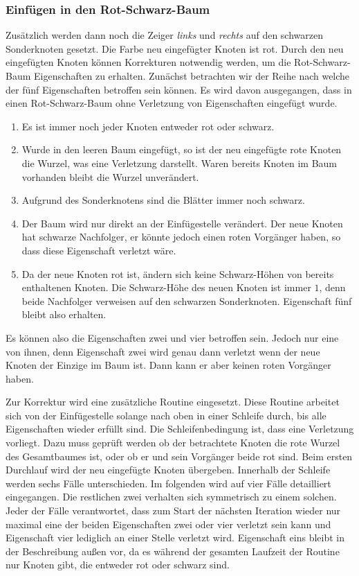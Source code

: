 \documentclass[a4paper,12pt]{article}
\begin{document}
\subsubsection{Einfügen in den Rot-Schwarz-Baum}


Zusätzlich werden dann noch die Zeiger \textit{links} und  \textit{rechts} auf den schwarzen Sonderknoten gesetzt. Die Farbe neu eingefügter Knoten ist rot. Durch den neu eingefügten Knoten können Korrekturen notwendig werden, um die Rot-Schwarz-Baum Eigenschaften zu erhalten. Zunächst betrachten wir der Reihe nach welche der fünf Eigenschaften betroffen sein können. Es wird davon ausgegangen, dass in einen Rot-Schwarz-Baum ohne Verletzung von Eigenschaften eingefügt wurde. \\

\begin{enumerate}
	\item Es ist immer noch jeder Knoten entweder rot oder schwarz.
	\item Wurde in den leeren Baum eingefügt, so ist der neu eingefügte rote Knoten die Wurzel, was eine Verletzung darstellt. Waren bereits Knoten im Baum vorhanden bleibt die Wurzel unverändert.
	\item Aufgrund des Sonderknotens sind die Blätter immer noch schwarz.
	\item Der Baum wird nur direkt an der Einfügestelle verändert. Der neue Knoten hat schwarze Nachfolger, er könnte jedoch einen roten Vorgänger haben, so dass diese Eigenschaft verletzt wäre.
	\item Da der neue Knoten rot ist, ändern sich keine Schwarz-Höhen von bereits enthaltenen Knoten. Die Schwarz-Höhe des neuen Knoten ist immer $1$, denn beide Nachfolger verweisen auf den schwarzen Sonderknoten. Eigenschaft fünf bleibt also erhalten. 
\end{enumerate}  

\noindent Es können also die Eigenschaften zwei und vier betroffen sein. Jedoch nur eine von ihnen, denn Eigenschaft zwei wird genau dann verletzt wenn der neue Knoten der Einzige im Baum ist. Dann kann er aber keinen roten Vorgänger haben.

 \noindent Zur Korrektur wird eine zusätzliche Routine eingesetzt. Diese Routine arbeitet sich von der Einfügestelle solange nach oben in einer Schleife durch, bis alle Eigenschaften wieder erfüllt sind. Die Schleifenbedingung ist, dass eine Verletzung vorliegt. Dazu muss geprüft werden ob der betrachtete Knoten die rote Wurzel des Gesamtbaumes ist, oder ob er und sein Vorgänger beide rot sind. Beim ersten Durchlauf wird der neu eingefügte Knoten übergeben. Innerhalb der Schleife werden sechs Fälle unterschieden. Im folgenden wird auf vier Fälle detailliert eingegangen. Die restlichen zwei verhalten sich symmetrisch zu einem solchen. Jeder der Fälle verantwortet, dass zum Start der nächsten Iteration wieder nur maximal eine der beiden Eigenschaften zwei oder vier verletzt sein kann und Eigenschaft vier lediglich an einer Stelle verletzt wird.  Eigenschaft eins bleibt in der Beschreibung außen vor, da es während der gesamten Laufzeit der Routine nur Knoten gibt, die entweder rot oder schwarz sind. \\
 
\end{document}
